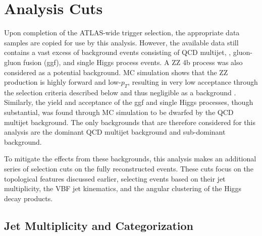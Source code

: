 

    \FloatBarrier
    \section{Analysis Cuts} \label{sec:analysis_cuts}

        Upon completion of the ATLAS-wide trigger selection,
            the appropriate data samples are copied for use by this analysis.
        However, the available data still contains a vast excess of background events
            consisting of QCD multijet, \ttbar, gluon-gluon fusion (ggf), and single Higgs process events.
        A ZZ \to 4b process was also considered as a potential background.
        MC simulation shows that the ZZ production is highly forward and low-$p_T$,
            resulting in very low acceptance through the selection criteria described below
            and thus negligible as a background \cite{vbf_hh_4b_resonant_2020_int}.
        Similarly, the yield and acceptance of the ggf and single Higgs processes, though substantial,
            was found through MC simulation to be dwarfed by the QCD multijet background\cite{hh4b_2021_int_note}.
        The only backgrounds that are therefore considered for this analysis are the
            dominant QCD multijet background and sub-dominant \ttbar background.

        To mitigate the effects from these backgrounds,
            this analysis makes an additional series of selection cuts on the fully reconstructed events.
        These cuts focus on the topological features discussed earlier,
            selecting events based on their jet multiplicity,
            the VBF jet kinematics,
            and the angular clustering of the Higgs decay products.

    \subsection{Jet Multiplicity and Categorization}
        
